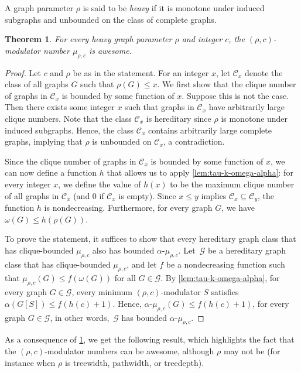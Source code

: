 \documentclass[11pt]{article}
\newcommand{\rhocm}{\mu_{\rho,c}}
\theoremstyle{plain}
\newtheorem{theorem}{Theorem}[section]
\theoremstyle{definition}
\theoremstyle{remark}
\numberwithin{equation}{section}
\begin{document}
A graph parameter $\rho$ is said to be \emph{heavy} if it is monotone under induced subgraphs and unbounded on the class of complete graphs.

\begin{theorem}\label{modulator is awesome}
For every heavy graph parameter $\rho$ and integer $c$, the $(\rho,c)$-modulator number $\rhocm$ is awesome.
\end{theorem}

\begin{proof}
Let $c$ and $\rho$ be as in the statement.
For an integer $x$, let $\mathcal{C}_x$ denote the class of all graphs $G$ such that $\rho(G)\le x$.
We first show that the clique number of graphs in $\mathcal{C}_x$ is bounded by some function of $x$.
Suppose this is not the case. 
Then there exists some integer $x$ such that graphs in $\mathcal{C}_x$ have arbitrarily large clique numbers.
Note that the class $\mathcal{C}_x$ is hereditary since $\rho$ is monotone under induced subgraphs. 
Hence, the class $\mathcal{C}_x$ contains arbitrarily large complete graphs, implying that $\rho$ is unbounded on $\mathcal{C}_x$, a contradiction.

Since the clique number of graphs in $\mathcal{C}_x$ is bounded by some function of $x$, we can now define a function $h$ that allows us to apply \cref{lem:tau-k-omega-alpha}: for every integer $x$, we define the value of $h(x)$ to be the maximum clique number of all graphs in $\mathcal{C}_x$ (and $0$ if $\mathcal{C}_x$ is empty).
Since $x\le y$ implies $\mathcal{C}_x\subseteq\mathcal{C}_y$, the function $h$ is nondecreasing.
Furthermore, for every graph $G$, we have $\omega(G) \le h(\rho(G))$.

To prove the statement, it suffices to show that every hereditary graph class that has clique-bounded $\rhocm$ also has bounded $\alpha\text{-}\rhocm$.
Let~$\mathcal{G}$ be a hereditary graph class that has clique-bounded $\rhocm$, and let $f$ be a nondecreasing function such that $\rhocm(G)\le f(\omega(G))$ for all $G\in \mathcal{G}$.
By \cref{lem:tau-k-omega-alpha}, for every graph $G\in \mathcal{G}$, every minimum $(\rho, c)$-modulator $S$ satisfies $\alpha(G[S])\le f(h(c)+1)$.
Hence, $\alpha\text{-}\rhocm(G)\le f(h(c)+1)$, for every graph $G\in \mathcal{G}$, in other words,~$\mathcal{G}$ has bounded $\alpha\text{-}\rhocm$.
\end{proof}

As a consequence of \cref{modulator is awesome}, we get the following result, which highlights the fact that the $(\rho,c)$-modulator numbers can be awesome, although $\rho$ may not be (for instance when $\rho$ is treewidth, pathwidth, or treedepth).
\end{document}
